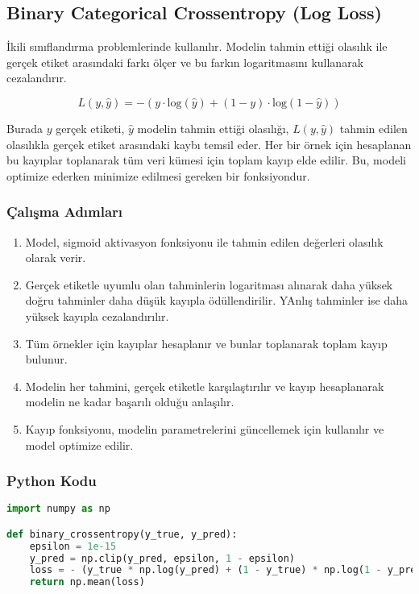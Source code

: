 \newpage

\subsection{Binary Categorical Crossentropy (Log Loss)}

İkili sınıflandırma problemlerinde kullanılır. Modelin tahmin ettiği olasılık ile gerçek etiket arasındaki farkı ölçer ve bu farkın logaritmasını kullanarak cezalandırır. 

\[ L(y, \hat{y}) = - (y \cdot \text{log}(\hat{y}) + (1 - y) \cdot \text{log}(1 - \hat{y})) \]

Burada $y$ gerçek etiketi, $\hat{y}$ modelin tahmin ettiği olasılığı, $L(y, \hat{y})$ tahmin edilen olasılıkla gerçek etiket arasındaki kaybı temsil eder. Her bir örnek için hesaplanan bu kayıplar toplanarak tüm veri kümesi için toplam kayıp elde edilir. Bu, modeli optimize ederken minimize edilmesi gereken bir fonksiyondur.

\subsubsection{Çalışma Adımları}

\begin{enumerate}
    \item Model, sigmoid aktivasyon fonksiyonu ile tahmin edilen değerleri olasılık olarak verir.
    \item Gerçek etiketle uyumlu olan tahminlerin logaritması alınarak daha yüksek doğru tahminler daha düşük kayıpla ödüllendirilir. YAnlış tahminler ise daha yüksek kayıpla cezalandırılır.
    \item Tüm örnekler için kayıplar hesaplanır ve bunlar toplanarak toplam kayıp bulunur.
    \item Modelin her tahmini, gerçek etiketle karşılaştırılır ve kayıp hesaplanarak modelin ne kadar başarılı olduğu anlaşılır.
    \item Kayıp fonksiyonu, modelin parametrelerini güncellemek için kullanılır ve model optimize edilir.
\end{enumerate}

\subsubsection{Python Kodu}

\begin{lstlisting}[language=Python]
import numpy as np

def binary_crossentropy(y_true, y_pred):
    epsilon = 1e-15
    y_pred = np.clip(y_pred, epsilon, 1 - epsilon)
    loss = - (y_true * np.log(y_pred) + (1 - y_true) * np.log(1 - y_pred))
    return np.mean(loss)
\end{lstlisting}

